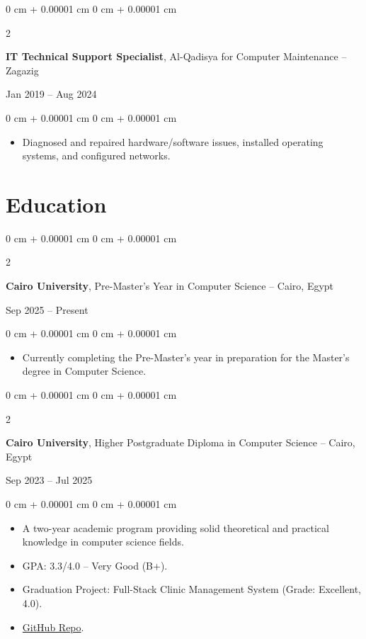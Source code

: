 \documentclass[10pt, letterpaper]{article}
\newenvironment{highlights}{
    \begin{itemize}[
        topsep=0.10 cm,
        parsep=0.10 cm,
        partopsep=0pt,
        itemsep=0pt,
        leftmargin=0 cm + 10pt
    ]
}{
    \end{itemize}
} %
\newenvironment{onecolentry}{
    \begin{adjustwidth}{
        0 cm + 0.00001 cm
    }{
        0 cm + 0.00001 cm
    }
}{
    \end{adjustwidth}
} %
\newenvironment{twocolentry}[2][]{
    \onecolentry
    \def\secondColumn{#2}
    \setcolumnwidth{\fill, 4.5 cm}
    \begin{paracol}{2}
}{
    \switchcolumn \raggedleft \secondColumn
    \end{paracol}
    \endonecolentry
} %
\begin{document}
    \vspace{0.2 cm}
    
    \begin{twocolentry}{Jan 2019 -- Aug 2024}
        \textbf{IT Technical Support Specialist}, Al-Qadisya for Computer Maintenance -- Zagazig
    \end{twocolentry}
    
    \vspace{0.10 cm}
    \begin{onecolentry}
        \begin{highlights}
            \item Diagnosed and repaired hardware/software issues, installed operating systems, and configured networks.
        \end{highlights}
    \end{onecolentry}

    \section{Education}
    
    \begin{twocolentry}{Sep 2025 -- Present}
        \textbf{Cairo University}, Pre-Master's Year in Computer Science -- Cairo, Egypt
    \end{twocolentry}
    
    \vspace{0.10 cm}
    \begin{onecolentry}
        \begin{highlights}
            \item Currently completing the Pre-Master’s year in preparation for the Master’s degree in Computer Science.
        \end{highlights}
    \end{onecolentry}
    
    \vspace{0.2 cm}
    
    \begin{twocolentry}{Sep 2023 -- Jul 2025}
        \textbf{Cairo University}, Higher Postgraduate Diploma in Computer Science -- Cairo, Egypt
    \end{twocolentry}
    
    \vspace{0.10 cm}
    \begin{onecolentry}
        \begin{highlights}
            \item A two-year academic program providing solid theoretical and practical knowledge in computer science fields.
            \item GPA: 3.3/4.0 -- Very Good (B+).
            \item Graduation Project: Full-Stack Clinic Management System (Grade: Excellent, 4.0).
            \item \href{https://github.com/M7-TROJAN/Medical-Clinic-Management-System}{GitHub Repo}.
        \end{highlights}
    \end{onecolentry}
    
\end{document}
